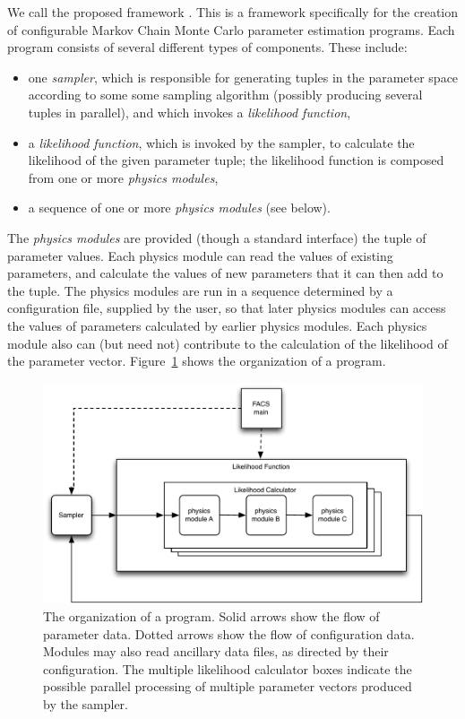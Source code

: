 \documentclass[draftmode,draftwater]{memarticle}
\newcommand{\cosmosis}{\name{CosmoSIS}\xspace}
\begin{document}
We call the proposed framework \cosmosis. This is a framework
specifically for the creation of configurable Markov Chain Monte Carlo
parameter estimation programs. Each program consists of several
different types of components. These include:
\begin{itemize}
\item one \emph{sampler}, which is responsible for generating tuples
  in the parameter space according to some some sampling algorithm
  (possibly producing several tuples in parallel), and which invokes a
  \emph{likelihood function},
\item a \emph{likelihood function}, which is invoked by the sampler,
  to calculate the likelihood of the given parameter tuple; the
  likelihood function is composed from one or more \emph{physics
    modules},
\item a sequence of one or more \emph{physics modules} (see below).
\end{itemize}

The \emph{physics modules} are provided (though a standard interface)
the tuple of parameter values. Each physics module can read the values
of existing parameters, and calculate the values of new parameters
that it can then add to the tuple. The physics modules are run in a
sequence determined by a configuration file, supplied by the user, so
that later physics modules can access the values of parameters
calculated by earlier physics modules. Each physics module also can
(but need not) contribute to the calculation of the likelihood of the
parameter vector. Figure~\ref{fig:despes} shows the organization of a
\cosmosis program.

\begin{figure}[htb]
\includegraphics[width=\textwidth]{despes}
\caption{The organization of a \cosmosis program. Solid arrows
  show the flow of parameter data. Dotted arrows show the flow of
  configuration data. Modules may also read ancillary data files, as
  directed by their configuration. The multiple likelihood calculator
  boxes indicate the possible parallel processing of multiple
  parameter vectors produced by the sampler.}
\label{fig:despes}
\end{figure}
\end{document}
